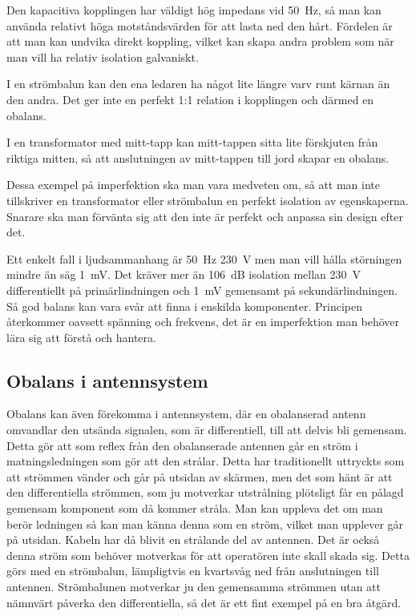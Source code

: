 Den kapacitiva kopplingen har väldigt hög impedans vid 50~Hz,  så man kan
använda relativt höga motståndsvärden för att lasta ned den hårt. Fördelen är
att man kan undvika direkt koppling, vilket kan skapa andra problem som när man
vill ha relativ isolation galvaniskt.

I en strömbalun kan den ena ledaren ha något lite längre varv runt kärnan än
den andra. Det ger inte en perfekt 1:1 relation i kopplingen och därmed en
obalans.

I en transformator med mitt-tapp kan mitt-tappen sitta lite förskjuten från
riktiga mitten, så att anslutningen av mitt-tappen till jord skapar en
obalans.

Dessa exempel på imperfektion ska man vara medveten om, så att man inte
tillskriver en transformator eller strömbalun en perfekt isolation av
egenskaperna. Snarare ska man förvänta sig att den inte är perfekt och
anpassa sin design efter det.

Ett enkelt fall i ljudsammanhang är 50~Hz 230~V men man vill hålla störningen
mindre än säg 1~mV. Det kräver mer än 106~dB isolation mellan 230~V
differentiellt på primärlindningen och 1~mV gemensamt på sekundärlindningen.
Så god balans kan vara svår att finna i enskilda komponenter. Principen
återkommer oavsett spänning och frekvens, det är en imperfektion man behöver
lära sig att förstå och hantera.

\subsection{Obalans i antennsystem}

Obalans kan även förekomma i antennsystem, där en obalanserad antenn omvandlar
den utsända signalen, som är differentiell, till att delvis bli gemensam.
Detta gör att som reflex från den obalanserade antennen går en ström i
matningsledningen som gör att den strålar. Detta har traditionellt uttryckts
som att strömmen vänder och går på utsidan av skärmen, men det som hänt är att
den differentiella strömmen, som ju motverkar utstrålning plötsligt får en
pålagd gemensam komponent som då kommer stråla. Man kan uppleva det om man
berör ledningen så kan man känna denna som en ström, vilket man upplever går
på utsidan. Kabeln har då blivit en strålande del av antennen. Det är också
denna ström som behöver motverkas för att operatören inte skall skada sig.
Detta görs med en strömbalun, lämpligtvis en kvartsvåg ned från anslutningen
till antennen. Strömbalunen motverkar ju den gemensamma strömmen utan att
nämnvärt påverka den differentiella, så det är ett fint exempel på en bra
åtgärd.

